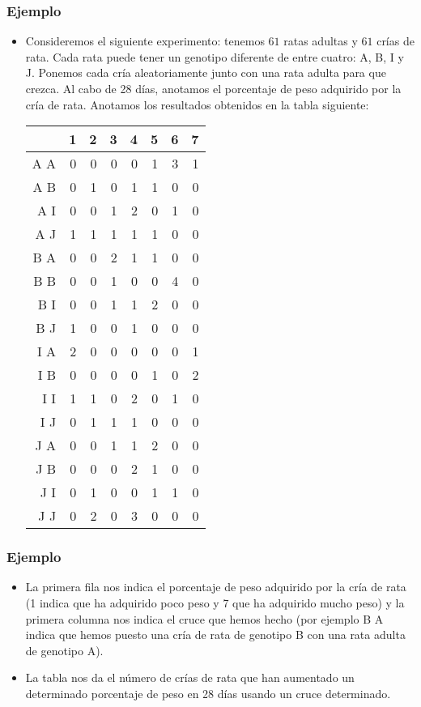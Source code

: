 \begin{frame}
\frametitle{Ejemplo}
\begin{itemize}
\item<2->{Consideremos el siguiente experimento: tenemos $61$ ratas adultas y $61$ crías de rata. Cada rata puede tener un genotipo diferente de entre cuatro: A, B, I y J. Ponemos cada cría aleatoriamente junto con una rata adulta para que crezca. Al cabo de 28 días, anotamos el porcentaje de peso adquirido por la cría de rata. Anotamos los resultados obtenidos en la tabla siguiente:
{\tiny\begin{table}[ht]
\begin{center}
\begin{tabular}{rrrrrrrr}
  \hline
 & 1 & 2 & 3 & 4 & 5 & 6 & 7 \\
\hline
A A&   0 &   0 &   0 &   0 &   1 &   3 &   1 \\
A B&   0 &   1 &   0 &   1 &   1 &   0 &   0 \\
A I&   0 &   0 &   1 &   2 &   0 &   1 &   0 \\
A J&   1 &   1 &   1 &   1 &   1 &   0 &   0 \\
B A&   0 &   0 &   2 &   1 &   1 &   0 &   0 \\
B B&   0 &   0 &   1 &   0 &   0 &   4 &   0 \\
B I&   0 &   0 &   1 &   1 &   2 &   0 &   0 \\
B J&   1 &   0 &   0 &   1 &   0 &   0 &   0 \\
I A&   2 &   0 &   0 &   0 &   0 &   0 &   1 \\
I B&   0 &   0 &   0 &   0 &   1 &   0 &   2 \\
I I&   1 &   1 &   0 &   2 &   0 &   1 &   0 \\
I J&   0 &   1 &   1 &   1 &   0 &   0 &   0 \\
J A&   0 &   0 &   1 &   1 &   2 &   0 &   0 \\
J B&   0 &   0 &   0 &   2 &   1 &   0 &   0 \\
J I&   0 &   1 &   0 &   0 &   1 &   1 &   0 \\
J J&   0 &   2 &   0 &   3 &   0 &   0 &   0 \\
   \hline
\end{tabular}
\end{center}
\end{table}
}}
\end{itemize}
\end{frame}
\begin{frame}
\frametitle{Ejemplo}
\begin{itemize}
\item<2->{La primera fila nos indica el porcentaje de peso adquirido por la cría de rata (1 indica que ha adquirido poco peso y 7 que ha adquirido mucho peso) y la primera columna nos indica el cruce que hemos hecho (por ejemplo B A indica que hemos puesto una cría de rata de genotipo B con una rata adulta de genotipo A).}
\item<3->{La tabla nos da el número de crías de rata que han aumentado un determinado porcentaje de peso en 28 días usando un cruce determinado.}
\end{itemize}
\end{frame}

